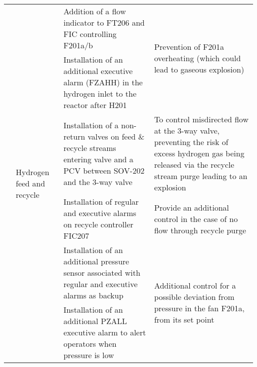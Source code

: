 \begin{table}[h]
\begin{tabularx}{\linewidth}{@{}lp{3cm}XX@{}}
     & \multirow[t]{6}{*}{Hydrogen feed and recycle} & Addition of a flow indicator to FT206 and FIC controlling F201a/b                                                                                             & \multirow[t]{2}{X}{Prevention of F201a overheating (which could lead to gaseous explosion)}                                                                                                                   \\ \cmidrule(lr){3-3}
     &                                            & Installation of an additional executive alarm (FZAHH) in the hydrogen inlet to the reactor after H201                                                         &                                                                                                                                                                                                                                                         \\ \cmidrule(l){3-4} 
     &                                            & Installation of a non-return valves on feed \& recycle streams entering valve and a PCV between SOV-202 and the 3-way valve                                   & To control misdirected flow at the 3-way valve, preventing the risk of excess hydrogen gas being released via the recycle stream purge leading to an explosion                                          \\ \cmidrule(l){3-4} 
     &                                            & Installation of regular and executive alarms on  recycle controller FIC207                                                                                    & Provide an additional control in the case of no flow through recycle purge                                                                                                                                 \\ \cmidrule(l){3-4} 
     &                                            & Installation of an additional pressure sensor associated with regular and executive alarms as backup                                                          & \multirow[t]{2}{X}{Additional control for a possible deviation from pressure in the fan F201a, from its set point}                                                                                            \\ \cmidrule(lr){3-3}
     &                                            & Installation of an additional PZALL executive alarm to alert operators when pressure is low                                                                   &                                                                                                                                                                                                                                                         \\ \cmidrule(l){2-4} 

\end{tabularx}
\end{table}

